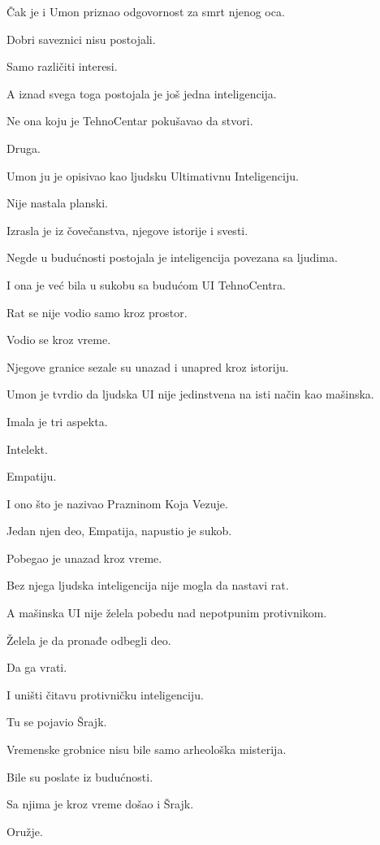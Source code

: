 Čak je i Umon priznao odgovornost za smrt njenog oca.

Dobri saveznici nisu postojali.

Samo različiti interesi.

\bigskip

A iznad svega toga postojala je još jedna inteligencija.

Ne ona koju je TehnoCentar pokušavao da stvori.

Druga.

Umon ju je opisivao kao ljudsku Ultimativnu Inteligenciju.

Nije nastala planski.

Izrasla je iz čovečanstva, njegove istorije i svesti.

Negde u budućnosti postojala je inteligencija povezana sa ljudima.

I ona je već bila u sukobu sa budućom UI TehnoCentra.

Rat se nije vodio samo kroz prostor.

Vodio se kroz vreme.

Njegove granice sezale su unazad i unapred kroz istoriju.

\bigskip

Umon je tvrdio da ljudska UI nije jedinstvena na isti način kao mašinska.

Imala je tri aspekta.

Intelekt.

Empatiju.

I ono što je nazivao Prazninom Koja Vezuje.

Jedan njen deo, Empatija, napustio je sukob.

Pobegao je unazad kroz vreme.

Bez njega ljudska inteligencija nije mogla da nastavi rat.

A mašinska UI nije želela pobedu nad nepotpunim protivnikom.

Želela je da pronađe odbegli deo.

Da ga vrati.

I uništi čitavu protivničku inteligenciju.

\bigskip

Tu se pojavio Šrajk.

Vremenske grobnice nisu bile samo arheološka misterija.

Bile su poslate iz budućnosti.

Sa njima je kroz vreme došao i Šrajk.

Oružje.


